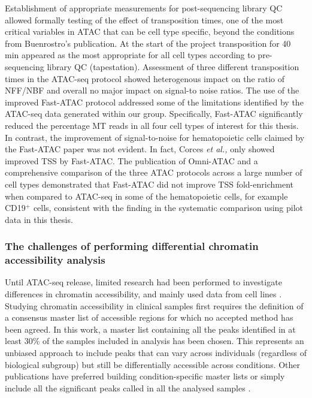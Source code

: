 Establishment of appropriate measurements for post-sequencing library QC allowed formally testing of the effect of transposition times, one of the most critical variables in ATAC that can be cell type specific, beyond the conditions from Buenrostro's publication. At the start of the project transposition for 40 min appeared as the most appropriate for all cell types according to pre-sequencing library QC (tapestation). Assessment of three different transposition times in the ATAC-seq protocol showed heterogenous impact on the ratio of NFF/NBF and overall no major impact on signal-to noise ratios. The use of the improved Fast-ATAC protocol addressed some of the limitations identified by the ATAC-seq data generated within our group. Specifically, Fast-ATAC significantly reduced the percentage MT reads in all four cell types of interest for this thesis. In contrast, the improvement of signal-to-noise for hematopoietic cells claimed by the Fast-ATAC paper was not evident. In fact, Corces \textit{et al.,} only showed improved TSS by Fast-ATAC. The publication of Omni-ATAC and a comprehensive comparison of the three ATAC protocols across a large number of cell types demonstrated that Fast-ATAC did not improve TSS fold-enrichment when compared to ATAC-seq in some of the hematopoietic cells, for example CD19$^+$ cells, consistent with the finding in the systematic comparison using pilot data in this thesis.


\subsubsection{The challenges of performing differential chromatin accessibility analysis}
Until ATAC-seq release, limited research had been performed to investigate differences in chromatin accessibility, and mainly used data from cell lines \parencite{Degner2012}. Studying chromatin accessibility in clinical samples first requires the definition of a consensus master list of accessible regions for which no accepted method has been agreed. In this work, a master list containing all the peaks identified in at least 30\% of the samples included in analysis has been chosen. This represents an unbiased approach to include peaks that can vary across individuals (regardless of biological subgroup) but still be differentially accessible across conditions. Other publications have preferred building condition-specific master lists or simply include all the significant peaks called in all the analysed samples \parencite{Alasoo2018, Turner2018}. 

